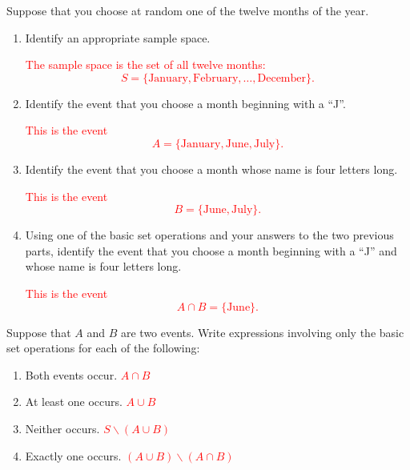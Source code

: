 \documentclass[12pt,reqno]{amsart}
\begin{document}
\bigskip
\prob Suppose that you choose at random one of the twelve months of the year.

\begin{enumerate}
\item Identify an appropriate sample space.
    
\bigskip
\textcolor{red}{The sample space is the set of all twelve months:
	\[
	S = \{\text{January}, \text{February},\ldots,\text{December}\}.
	\]}
\bigskip

\item Identify the event that you choose a month beginning with a ``J''.
    
\bigskip
\textcolor{red}{This is the event
	\[
	A = \{\text{January}, \text{June}, \text{July} \}.
	\]}
\bigskip

\item Identify the event that you choose a month whose name is four letters long.
    
\bigskip
\textcolor{red}{This is the event
	\[
	B = \{\text{June},\text{July} \}.
	\]}
\bigskip

\item Using one of the basic set operations and your answers to the two previous parts, identify the event that you choose a month beginning with a ``J'' and whose name is four letters long.
    
\bigskip
\textcolor{red}{This is the event
	\[
	A\cap B= \{\text{June}\}.
	\]}
\end{enumerate}
























\bigskip
\prob Suppose that $A$ and $B$ are two events. Write expressions involving only the basic set operations for each of the following:

\bigskip
\begin{enumerate}
\item Both events occur. \textcolor{red}{$A\cap B$}
\item At least one occurs. \textcolor{red}{$A\cup B$}
\item Neither occurs. \textcolor{red}{$S \smallsetminus (A\cup B)$}
\item Exactly one occurs. \textcolor{red}{$(A\cup B)\smallsetminus(A\cap B)$}
\end{enumerate}
\end{document}
